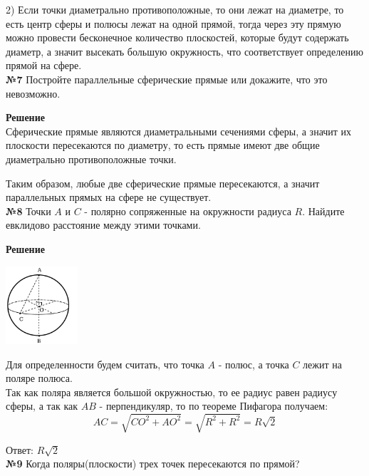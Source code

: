     2) Если точки диаметрально противоположные, то они лежат на диаметре, то есть центр сферы и полюсы лежат на одной прямой,
    тогда через эту прямую можно провести бесконечное количество плоскостей, которые будут содержать диаметр, а значит
    высекать большую окружность, что соответствует определению прямой на сфере.\\


    \textbf{№7}
    Постройте параллельные сферические прямые или докажите, что это невозможно.

    \textbf{Решение}\\

    Сферические прямые являются диаметральными сечениями сферы, а значит их
    плоскости пересекаются по диаметру, то есть прямые имеют две общие диаметрально
    противоположные точки.

    Таким образом, любые две сферические прямые пересекаются, а значит параллельных прямых на сфере не существует.\\


    \textbf{№8}
    Точки $A$ и $C$ - полярно сопряженные на окружности радиуса $R$.
    Найдите евклидово расстояние между этими точками.

    \textbf{Решение}\\

    \begin{center}
        \includegraphics[width=0.2\textwidth]{images/img2}\\
    \end{center}

    Для определенности будем считать, что точка $A$ - полюс, а точка $C$ лежит на поляре полюса.\\

    Так как поляра является большой окружностью, то ее радиус равен радиусу сферы, а так как $AB$ - перпендикуляр,
    то по теореме Пифагора получаем:
    \[
        AC = \sqrt {CO ^ 2 + AO ^ 2} = \sqrt {R ^ 2 + R ^ 2} = R\sqrt {2}
    \]

    Ответ: $R\sqrt{2}$\\


    \textbf{№9}
    Когда поляры(плоскости) трех точек пересекаются по прямой?


